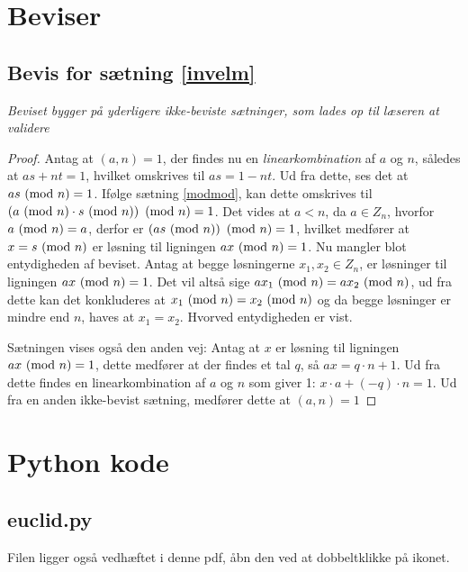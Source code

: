 \section{Beviser}
\subsection{Bevis for sætning \ref{invelm}}\label{invelemproof}
\textit{Beviset bygger på yderligere ikke-beviste sætninger, som lades op til læseren at validere}
\begin{proof}
    Antag at \((a, n) = 1\), der findes nu en \textit{linearkombination} af \(a\) og \(n\), således at \(a s + n t = 1\),
    hvilket omskrives til \(a s = 1 - n t\).
    Ud fra dette, ses det at \(a s \ (\mathrm{mod}\ n) = 1\).
    Ifølge sætning \ref{modmod}, kan dette omskrives til \(\left(a \ (\mathrm{mod}\ n) \cdot s \ (\mathrm{mod}\ n)\right) \ (\mathrm{mod}\ n) = 1\).
    Det vides at \(a < n\), da \(a \in Z_n\), hvorfor \(a \ (\mathrm{mod}\ n) = a\),
    derfor er \(\left(a s \ (\mathrm{mod}\ n)\right) \ (\mathrm{mod}\ n) = 1\),
    hvilket medfører at \(x = s \ (\mathrm{mod}\ n)\) er løsning til ligningen \(a x \ (\mathrm{mod}\ n) = 1\).
    Nu mangler blot entydigheden af beviset.
    Antag at begge løsningerne \(x_1, x_2 \in Z_n\), er løsninger til ligningen \(a x \ (\mathrm{mod}\ n) = 1\).
    Det vil altså sige \(a x_1 \ (\mathrm{mod}\ n) = a x_2 \ (\mathrm{mod}\ n)\),
    ud fra dette kan det konkluderes at \(x_1 \ (\mathrm{mod}\ n) = x_2 \ (\mathrm{mod}\ n)\)
    og da begge løsninger er mindre end \(n\), haves at \(x_1 = x_2\).
    Hvorved entydigheden er vist.

    Sætningen vises også den anden vej:
    Antag at \(x\) er løsning til ligningen \(a x \ (\mathrm{mod}\ n) = 1\),
    dette medfører at der findes et tal \(q\), så \(a x = q \cdot n + 1\).
    Ud fra dette findes en linearkombination af \(a\) og \(n\) som giver 1:
    \(x \cdot a + (-q) \cdot n = 1\).
    Ud fra en anden ikke-bevist sætning, medfører dette at \((a, n) = 1\)

\end{proof}


\newpage
\section{Python kode}
\subsection{euclid.py}
\label{file:euclid}
Filen ligger også vedhæftet i denne pdf, åbn den ved at dobbeltklikke på ikonet.
\inputminted[python3, linenos, breaklines, frame=lines, fontsize=\footnotesize]{python}{src/euclid.py}


